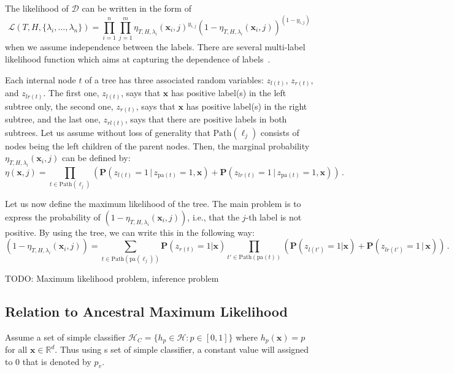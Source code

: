 \documentclass{article}
\newcommand{\R}{\mathbb{R}}
\newcommand{\cD}{\mathcal{D}}
\newcommand{\cH}{\mathcal{H}}
\newcommand{\cL}{\mathcal{L}}
\newcommand{\Path}[1]{\mathrm{Path}(#1)}
\newcommand{\pa}[1]{\mathrm{pa}(#1)}
\newcommand{\bx}{\mathbf{x}}
\newcommand{\prob}{\mathbf{P}}
\newcommand{\given}{\, | \,}
\begin{document}
The likelihood of $\cD$ can be written in the form of
\[
\cL ( T, H, \{ \lambda_i, \dots, \lambda_n\} ) = \prod_{i=1}^{n} \prod_{j=1}^m \eta_{T,H,\lambda_i} ( \bx_i , j )^{y_{i,j}} (1-\eta_{T,H,\lambda_i} ( \bx_i , j ))^{(1-y_{i,j})}
\]
when we assume independence between the labels. There are several multi-label likelihood function which aims at capturing the dependence of labels~\citep{ZhangS12}. 

Each internal node $t$ of a tree has three associated random variables: $z_{l(t)}$, $z_{r(t)}$, and $z_{lr(t)}$. The first one, $z_{l(t)}$, says that $\bx$ has positive label(s) in the left subtree only, the second one, $z_{r(t)}$, says that $\bx$ has positive label(s) in the right subtree, and the last one, $z_{rl(t)}$, says that there are positive labels in both subtrees. Let us assume without loss of generality that $\Path{\ell_j}$ consists of nodes being the left children of the parent nodes. Then, the marginal probability $\eta_{T,H,\lambda_i} ( \bx_i , j )$ can be defined by:
\begin{equation}
\eta(\bx, j) = \prod_{t \in \Path{\ell_j}}  \left ( \prob(z_{l(t)} = 1 \given z_{\pa{t}} =1, \bx) + \prob(z_{lr(t)} = 1 \given z_{\pa{t}} =1, \bx) \right ) \,.
\label{eqn:probabilistic_tree}
\end{equation}

Let us now define the maximum likelihood of the tree. The main problem is to express the probability of $(1-\eta_{T,H,\lambda_i} ( \bx_i , j ))$, i.e., that the $j$-th label is not positive. By using the tree, we can write this in the following way:
$$
(1-\eta_{T,H,\lambda_i} ( \bx_i , j )) = \sum_{t \in \Path{\pa{\ell_j}}}   \prob(z_{r(t)} = 1 | \bx)  \prod_{t' \in \Path{\pa{t}}} \left ( \prob(z_{l(t')} = 1 | \bx) + \prob(z_{lr(t')} = 1 \given \bx) \right )  \,.
$$

TODO: Maximum likelihood problem, inference problem

\subsection{Relation to Ancestral Maximum Likelihood}

Assume a set of simple classifier $\cH_{C} = \{h_p\in \cH : p\in [0,1] \}$ where $h_p(\bx) = p$ for all $\bx \in \R^d$. Thus using s set of simple classifier, a constant value will assigned to $0$ that is denoted by $p_v$.
\end{document}
